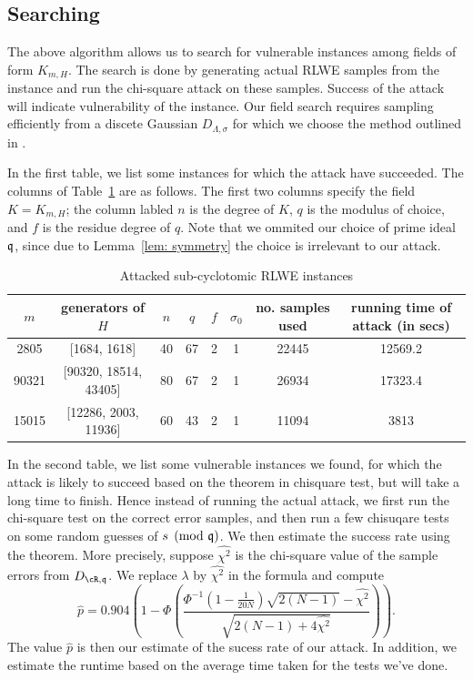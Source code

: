\documentclass{amsart}
\begin{document}
\subsection{Searching}

The above algorithm allows us to search for vulnerable instances among fields of form $K_{m,H}$. The search is done by generating actual RLWE samples from the instance and run the chi-square attack on these samples. Success of the attack will indicate vulnerability of the instance. Our field search requires sampling efficiently from a discete Gaussian $D_{\Lambda, \sigma}$ for which we choose the method outlined in \cite{gentry2008trapdoors}.

In the first table, we list some instances for which the attack have succeeded. The columns of Table~\ref{tab: attacked} are as follows. The first two columns specify the field $K = K_{m,H}$; the column labled $n$ is the degree of $K$, $q$ is the modulus of choice, and $f$ is the residue degree of $q$. Note that we ommited our choice of prime ideal $\mathfrak{q}$, since due to Lemma~\ref{lem: symmetry} the choice is irrelevant to our attack.

\begin{table}[H] \label{tab: attacked}
\caption{Attacked sub-cyclotomic RLWE instances}
\begin{tabular}{c|c|c|c|c|c|c|c}
$m$ & generators of $H$ & $n$ & $q$ & $f$ & $\sigma_0$ & no. samples used & running time of attack (in secs) \\ \hline
2805 &  [1684, 1618] & 40 & 67 & 2 & 1 & 22445 & 12569.2 \\
90321 & [90320, 18514, 43405] & 80 & 67 & 2 & 1 & 26934 & 17323.4 \\
15015 & [12286, 2003, 11936] & 60 & 43 & 2 & 1 & 11094 & 3813
\end{tabular}
\end{table}

In the second table, we list some vulnerable instances we found, for which the attack is likely to succeed based on
the theorem in chisquare test, but will take a long time to finish. Hence instead of running the actual attack, we first run the chi-square test on the correct error samples, and then run a few chisuqare tests on some random guesses of $s \pmod{\mathfrak{q}}$. We then estimate the success rate using the theorem. More precisely, suppose $\hat{\chi^2}$ is the chi-square value of the sample errors from $D_{\cR, \fq}$. We replace $\lambda$ by $\hat{\chi^2}$ in the formula and compute
\[
    \hat{p}  = 0.904 \left(1 - \Phi \left(\frac{\Phi^{-1}(1- \frac{1}{20N})\sqrt{2(N-1)}- \hat{\chi^2}}{\sqrt{2(N-1) +4\hat{\chi^2}}}\right)\right).
\]
The value $\hat{p}$ is then our estimate of the sucess rate of our attack.  In addition, we estimate the runtime based on the average time taken for the tests we've done.
\end{document}
